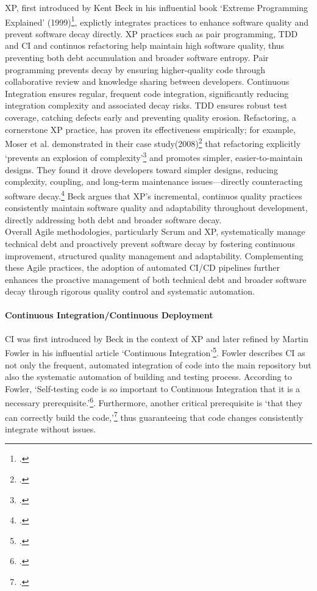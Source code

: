 \ac{XP}, first introduced by Kent Beck in his influential book `Extreme Programming Explained' (1999)\footcite{beckExtremeProgrammingExplained1999},
explictly integrates practices to enhance software quality and prevent software decay directly.
\ac{XP} practices such as pair programming, \ac{TDD} and \ac{CI} and continuos refactoring help maintain high software quality, thus preventing both debt accumulation
and broader software entropy.
Pair programming prevents decay by ensuring higher-quality code through collaborative review and knowledge sharing between developers.
Continuous Integration ensures regular, frequent code integration, significantly reducing integration complexity and associated decay risks.
\ac{TDD} ensures robust test coverage, catching defects early and preventing quality erosion.
Refactoring, a cornerstone XP practice, has proven its effectiveness empirically; for example, Moser et al.
demonstrated in their case study(2008)\footcite{moserCaseStudyImpact2008} that refactoring explicitly `prevents an explosion of complexity'\footcite[262]{moserCaseStudyImpact2008}
and promotes simpler, easier-to-maintain designs.
They found it drove developers toward simpler designs, reducing complexity, coupling, and long-term maintenance issues—directly counteracting software decay.\footcite[262]{moserCaseStudyImpact2008}
Beck argues that \ac{XP}'s incremental, continuos quality practices consistently maintain software quality and adaptability throughout development, directly addressing both debt and broader software decay.\\
Overall Agile methodologies, particularly Scrum and \ac{XP}, systematically manage technical debt and proactively prevent software decay by fostering continuous improvement, structured quality management and adaptability.
Complementing these Agile practices, the adoption of automated \ac{CI/CD} pipelines further enhances the proactive management of both technical debt
and broader software decay through rigorous quality control and systematic automation.\\

\paragraph{Continuous Integration/Continuous Deployment}
\ac{CI} was first introduced by Beck in the context of \ac{XP} and later refined by Martin Fowler in his influential article `Continuous Integration'\footcite{fowlerContinuousIntegration2006}.
Fowler describes \ac{CI} as not only the frequent, automated integration of code into the main repository but also the systematic automation of building and testing process.
According to Fowler, `Self-testing code is so important to Continuous Integration that it is a necessary prerequisite.'\footcite{fowlerContinuousIntegration2006}.
Furthermore, another critical prerequisite is `that they can correctly build the code,'\footcite{fowlerContinuousIntegration2006} thus guaranteeing that code changes consistently
integrate without issues.\\

